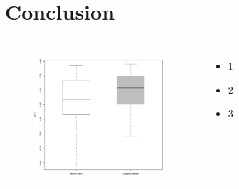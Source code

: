 \documentclass[presentation]{beamer}   %
\begin{document}
\section{Conclusion}
\begin{frame}
  \begin{columns}[t] %
		\begin{figure}
		\centering
			\includegraphics[width=50mm,height=50mm]{fig/boxplot.pdf}
		\end{figure}
		\centering
		\begin{itemize}
			\item 1
			\item 2 
			\item 3
			\end{itemize}
  \end{columns}

\end{frame}
\end{document}
